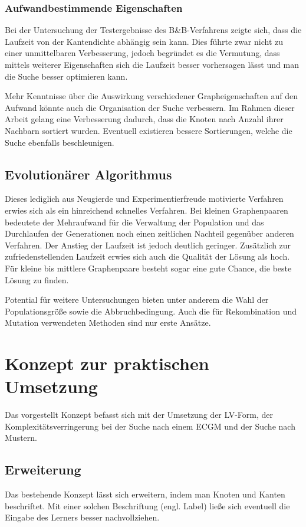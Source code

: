 \subsubsection{Aufwandbestimmende Eigenschaften}
Bei der Untersuchung der Testergebnisse des B\&B-Verfahrens zeigte sich, 
dass die Laufzeit von der Kantendichte abhängig sein kann. Dies führte zwar 
nicht zu einer unmittelbaren Verbesserung, jedoch begründet es die Vermutung, 
dass mittels weiterer Eigenschaften sich die Laufzeit besser vorhersagen 
lässt und man die Suche besser optimieren kann.

Mehr Kenntnisse über die Auswirkung verschiedener Grapheigenschaften auf den 
Aufwand könnte auch die Organisation der Suche verbessern. Im Rahmen dieser 
Arbeit gelang eine Verbesserung dadurch, dass die Knoten nach Anzahl ihrer 
Nachbarn sortiert wurden. Eventuell existieren bessere Sortierungen, welche 
die Suche ebenfalls beschleunigen.


\subsection{Evolutionärer Algorithmus}
Dieses lediglich aus Neugierde und Experimentierfreude motivierte Verfahren 
erwies sich als ein hinreichend schnelles Verfahren. Bei kleinen 
Graphenpaaren bedeutete der Mehraufwand für die Verwaltung der Population 
und das Durchlaufen der Generationen noch einen zeitlichen Nachteil 
gegenüber anderen Verfahren. Der Anstieg der Laufzeit ist jedoch deutlich 
geringer. Zusätzlich zur zufriedenstellenden Laufzeit erwies sich auch die 
Qualität der Lösung als hoch. Für kleine bis mittlere Graphenpaare besteht 
sogar eine gute Chance, die beste Lösung zu finden.

Potential für weitere Untersuchungen bieten unter anderem die Wahl der 
Populationsgröße sowie die Abbruchbedingung. Auch die für Rekombination und 
Mutation verwendeten Methoden sind nur erste Ansätze.


\section{Konzept zur praktischen Umsetzung}
Das vorgestellt Konzept befasst sich mit der Umsetzung der LV-Form, der 
Komplexitätsverringerung bei der Suche nach einem ECGM und der Suche nach 
Mustern.

\subsection{Erweiterung}
Das bestehende Konzept lässt sich erweitern, indem man Knoten und Kanten 
beschriftet. Mit einer solchen Beschriftung (engl. Label) ließe sich 
eventuell die Eingabe des Lerners besser nachvollziehen.

